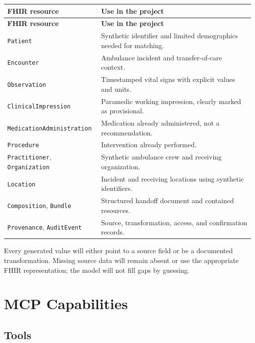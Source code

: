 \documentclass[10pt]{article}
\newcommand{\term}[1]{\texttt{#1}}
\begin{document}
\begin{longtable}{@{}>{\raggedright\arraybackslash}p{38mm}>{\raggedright\arraybackslash}p{115mm}@{}}
\toprule
\textbf{FHIR resource} & \textbf{Use in the project} \\
\midrule
\endfirsthead
\toprule
\textbf{FHIR resource} & \textbf{Use in the project} \\
\midrule
\endhead
\term{Patient} & Synthetic identifier and limited demographics needed for matching. \\
\term{Encounter} & Ambulance incident and transfer-of-care context. \\
\term{Observation} & Timestamped vital signs with explicit values and units. \\
\term{ClinicalImpression} & Paramedic working impression, clearly marked as provisional. \\
\term{MedicationAdministration} & Medication already administered, not a recommendation. \\
\term{Procedure} & Intervention already performed. \\
\term{Practitioner}, \term{Organization} & Synthetic ambulance crew and receiving organization. \\
\term{Location} & Incident and receiving locations using synthetic identifiers. \\
\term{Composition}, \term{Bundle} & Structured handoff document and contained resources. \\
\term{Provenance}, \term{AuditEvent} & Source, transformation, access, and confirmation records. \\
\bottomrule
\end{longtable}

Every generated value will either point to a source field or be a documented transformation. Missing source data will remain absent or use the appropriate FHIR representation; the model will not fill gaps by guessing.

\section{MCP Capabilities}

\subsection{Tools}
\end{document}
